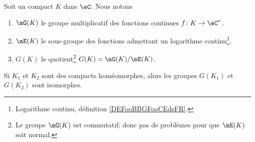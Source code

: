 \begin{definition}        \label{DEFooURFMooXIaRkl}
    Soit un compact \( K\) dans \( \eC\). Nous notons
    \begin{enumerate}
        \item
            \( \mG(K)\) le groupe multiplicatif des fonctions continues \( f\colon K\to \eC^*\).
        \item
            \( \mE(K)\) le sous-groupe des fonctions admettant un logarithme continu\footnote{Logarithme continu, définition \ref{DEFooBBGFooCEdsFR}.}.
        \item
            \( G(K)\) le quotient\footnote{Le groupe \( \mG(K)\) est commutatif; donc pas de problèmes pour que \( \mE(K)\) soit normal.} \( G(K)=\mG(K)/\mE(K)\).
    \end{enumerate}
\end{definition}

\begin{lemma}     \label{LEMooHEOWooHTtHsJ}
    Si \( K_1\) et \( K_2\) sont des compacts homéomorphes, alors les groupes \( G(K_1)\) et \( G(K_2)\) sont isomorphes.
\end{lemma}

